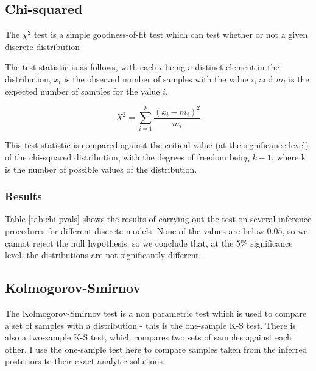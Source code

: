 \subsection{Chi-squared}

The $\chi^2$ test is a simple goodness-of-fit test which can test whether or not a given discrete distribution 


The test statistic is as follows, with each $i$ being a distinct element in the distribution, $x_i$ is the observed number of samples with the value $i$, and $m_i$ is the expected number of samples for the value $i$.

$$X^{2}=\sum _{i=1}^{k}{\frac {(x_{i}-m_{i})^{2}}{m_{i}}}$$

This test statistic is compared against the critical value (at the significance level) of the chi-squared distribution, with the degrees of freedom being $k-1$, where k is the number of possible values of the distribution.
\subsubsection{Results}
\begin{table}[!ht]
	\centering
	\caption{p-values of $\chi^2$ test on different models using different inference procedures}
	\label{tab:chi-pvals}
\end{table}

Table \ref{tab:chi-pvals} shows the results of carrying out the test on several inference procedures for different discrete models. None of the values are below 0.05, so we cannot reject the null hypothesis, so we conclude that, at the 5\% significance level, the distributions are not significantly different.

\subsection{Kolmogorov-Smirnov}

The Kolmogorov-Smirnov test is a non parametric test which is used to compare a set of samples with a distribution - this is the one-sample K-S test. There is also a two-sample K-S test, which compares two sets of samples against each other. I use the one-sample test here to compare samples taken from the inferred posteriors to their exact analytic solutions.

